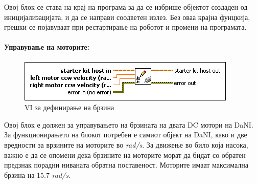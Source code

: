 \documentclass[12pt]{article}
\begin{document}
      Овој блок се става на крај на програма за да се избрише објектот создаден од иницијализацијата, и да се направи соодветен излез. Без оваа крајна фунцкија, грешки се појавуваат при рестартирање на роботот и промени на програмата.
			\\

    \paragraph{Управување на моторите:\\}
      \begin{figure}[h]
				\includegraphics[width=0.45\linewidth]{./images/write_dc.png}
				\raggedright
				\caption{VI за дефинирање на брзина}
				\label{fig:write_dc.png}
				\end{figure}

			Овој блок е должен за управувањето на брзината на двата DC мотори на DaNI. За функционирањето на блокот потребен е самиот објект на DaNI, како и две вредности за врзините на моторите во \textit{rad/s}. За движење во било која насока, важно е да се опомени дека брзините на моторите морат да бидат со обратен предзнак порадни ниваната обратна поставеност. Моторите имаат максимална брзина на 15.7 \textit{rad/s}.
\end{document}

